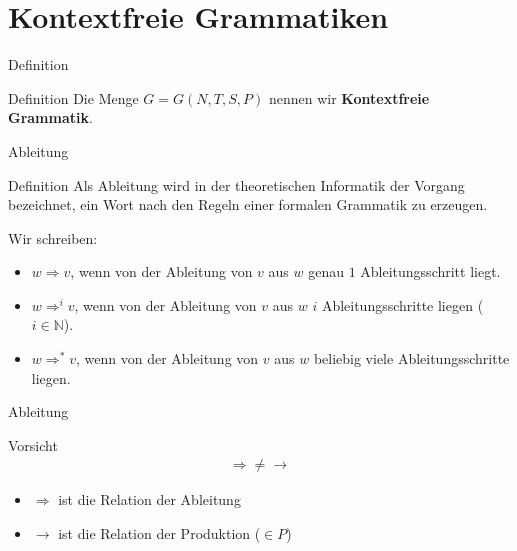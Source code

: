 \section{Kontextfreie Grammatiken}
\begin{frame}{Definition}
    \begin{block}{Definition}
        Die Menge $G = G \left( N, T, S, P \right)$ nennen wir \textbf{Kontextfreie Grammatik}.
    \end{block}
    \pause
\end{frame}

\begin{frame}{Ableitung}
    \begin{block}{Definition}
        Als Ableitung wird in der theoretischen Informatik der Vorgang bezeichnet, ein Wort nach den Regeln einer formalen Grammatik zu erzeugen.
    \end{block}
    Wir schreiben: \pause
    \begin{itemize}
        \item $w \Rightarrow v$, wenn von der Ableitung von $v$ aus $w$ genau $1$ Ableitungsschritt liegt.\pause
        \item $w \Rightarrow^i v$, wenn von der Ableitung von $v$ aus $w$ $i$ Ableitungsschritte liegen ($i \in \mathbb{N}$).\pause
        \item $w \Rightarrow^* v$, wenn von der Ableitung von $v$ aus $w$ beliebig viele Ableitungsschritte liegen.
    \end{itemize}
\end{frame}

\begin{frame}{Ableitung}
    \begin{alertblock}{Vorsicht}
        \begin{align*}
            \Rightarrow \neq \rightarrow
        \end{align*}
        \begin{itemize}
            \item $\Rightarrow$ ist die Relation der Ableitung
            \item $\rightarrow$ ist die Relation der Produktion ($\in P$)
        \end{itemize}
    \end{alertblock}
\end{frame}

